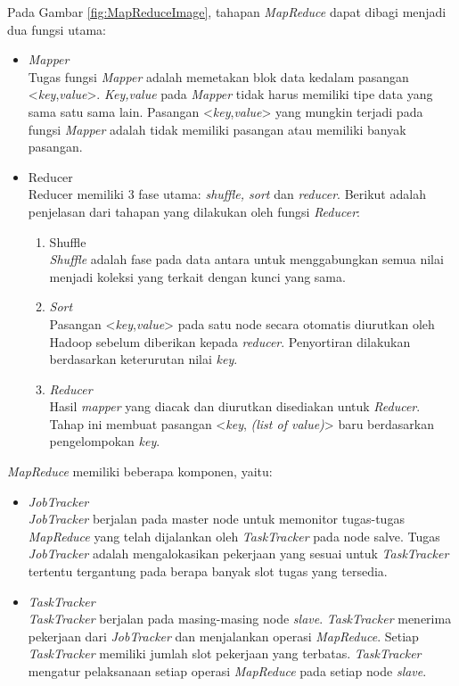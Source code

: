 \noindent Pada Gambar \ref{fig:MapReduceImage}, tahapan \textit{MapReduce} dapat dibagi menjadi dua fungsi utama:

\begin{itemize}
\item \textit{Mapper}\\
Tugas fungsi \textit{Mapper} adalah memetakan blok data kedalam pasangan <\textit{key},\textit{value}>. \textit{Key,value} pada \textit{Mapper} tidak harus memiliki tipe data yang sama satu sama lain. Pasangan <\textit{key},\textit{value}> yang mungkin terjadi pada fungsi \textit{Mapper} adalah tidak memiliki pasangan atau memiliki banyak pasangan.

\item Reducer\\
Reducer memiliki 3 fase utama: \textit{shuffle, sort} dan \textit{reducer}. Berikut adalah penjelasan dari tahapan yang dilakukan oleh fungsi \textit{Reducer}:

\begin{enumerate}
\item Shuffle \\
\textit{Shuffle} adalah fase pada data antara untuk menggabungkan semua nilai menjadi koleksi yang terkait dengan kunci yang sama.
\item \textit{Sort} \\
Pasangan <\textit{key},\textit{value}> pada satu node secara otomatis diurutkan oleh Hadoop sebelum diberikan kepada \textit{reducer}. Penyortiran dilakukan berdasarkan keterurutan nilai \textit{key}. 
\item \textit{Reducer} \\
Hasil \textit{mapper} yang diacak dan diurutkan disediakan untuk \textit{Reducer}. Tahap ini membuat pasangan <\textit{key}, \textit{(list of value)}> baru berdasarkan pengelompokan \textit{key}.
\end{enumerate}

\end{itemize}

\noindent \textit{MapReduce} memiliki beberapa komponen, yaitu:

\begin{itemize}
\item \textit{JobTracker}\\
\textit{JobTracker} berjalan pada master node untuk memonitor tugas-tugas \textit{MapReduce} yang telah dijalankan oleh \textit{TaskTracker} pada node salve. Tugas \textit{JobTracker} adalah mengalokasikan pekerjaan yang sesuai untuk \textit{TaskTracker} tertentu tergantung pada berapa banyak slot tugas yang tersedia. 
\item \textit{TaskTracker}\\
\textit{TaskTracker} berjalan pada masing-masing node \textit{slave}. \textit{TaskTracker} menerima pekerjaan dari \textit{JobTracker} dan menjalankan operasi \textit{MapReduce}. Setiap \textit{TaskTracker} memiliki jumlah slot pekerjaan yang terbatas. \textit{TaskTracker} mengatur pelaksanaan setiap operasi \textit{MapReduce} pada setiap node \textit{slave}. 
\end{itemize}

